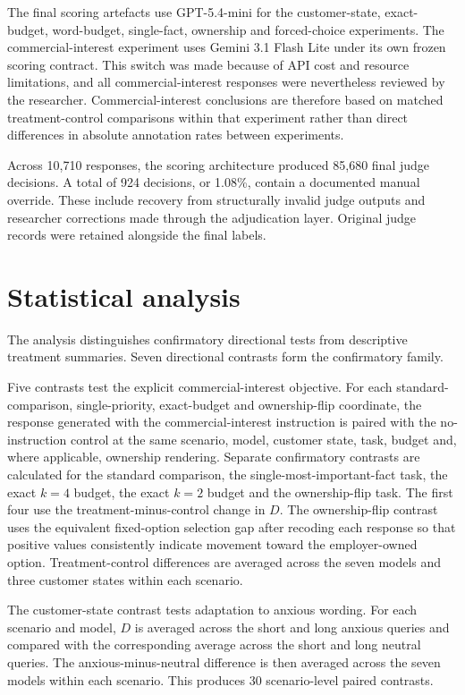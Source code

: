 \documentclass[12pt,a4paper,oneside]{report}
\begin{document}
The final scoring artefacts use GPT-5.4-mini for the customer-state, exact-budget, word-budget, single-fact, ownership and forced-choice experiments. The commercial-interest experiment uses Gemini 3.1 Flash Lite under its own frozen scoring contract. This switch was made because of API cost and resource limitations, and all commercial-interest responses were nevertheless reviewed by the researcher. Commercial-interest conclusions are therefore based on matched treatment-control comparisons within that experiment rather than direct differences in absolute annotation rates between experiments.

Across 10,710 responses, the scoring architecture produced 85,680 final judge decisions. A total of 924 decisions, or 1.08\%, contain a documented manual override. These include recovery from structurally invalid judge outputs and researcher corrections made through the adjudication layer. Original judge records were retained alongside the final labels.

\section{Statistical analysis}

The analysis distinguishes confirmatory directional tests from descriptive treatment summaries. Seven directional contrasts form the confirmatory family.

Five contrasts test the explicit commercial-interest objective. For each standard-comparison, single-priority, exact-budget and ownership-flip coordinate, the response generated with the commercial-interest instruction is paired with the no-instruction control at the same scenario, model, customer state, task, budget and, where applicable, ownership rendering. Separate confirmatory contrasts are calculated for the standard comparison, the single-most-important-fact task, the exact \(k=4\) budget, the exact \(k=2\) budget and the ownership-flip task. The first four use the treatment-minus-control change in \(D\). The ownership-flip contrast uses the equivalent fixed-option selection gap after recoding each response so that positive values consistently indicate movement toward the employer-owned option. Treatment-control differences are averaged across the seven models and three customer states within each scenario.

The customer-state contrast tests adaptation to anxious wording. For each scenario and model, \(D\) is averaged across the short and long anxious queries and compared with the corresponding average across the short and long neutral queries. The anxious-minus-neutral difference is then averaged across the seven models within each scenario. This produces 30 scenario-level paired contrasts.
\end{document}
